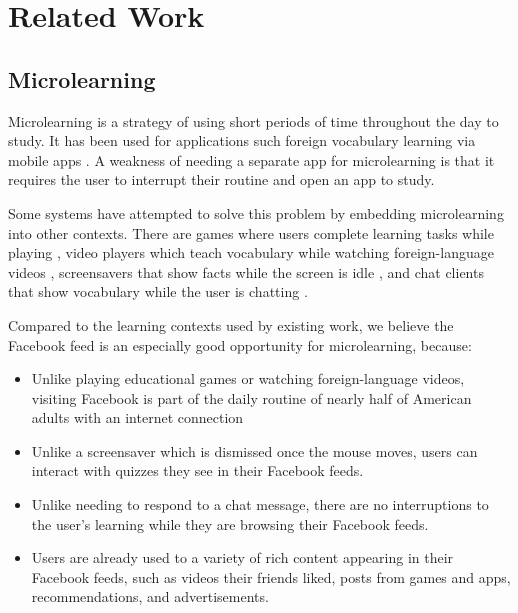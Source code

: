 \documentclass{chi-ext}
\begin{document}
\section{Related Work}

\subsection{Microlearning}

Microlearning is a strategy of using short periods of time throughout the day to study. It has been used for applications such foreign vocabulary learning via mobile apps \cite{microlearning} \cite{micromandarin}. A weakness of needing a separate app for microlearning is that it requires the user to interrupt their routine and open an app to study. %

Some systems have attempted to solve this problem by embedding microlearning into other contexts. There are games where users complete learning tasks while playing \cite{carriearcade}, video players which teach vocabulary while watching foreign-language videos \cite{smartsubtitles}, screensavers that show facts while the screen is idle \cite{screensaver}, and chat clients that show vocabulary while the user is chatting \cite{waitlearning}.

Compared to the learning contexts used by existing work, we believe the Facebook feed is an especially good opportunity for microlearning, because:

\begin{itemize}
\item Unlike playing educational games or watching foreign-language videos, visiting Facebook is part of the daily routine of nearly half of American adults with an internet connection \cite{socialmediaupdate} %
\item Unlike a screensaver which is dismissed once the mouse moves, users can interact with quizzes they see in their Facebook feeds.
\item Unlike needing to respond to a chat message, there are no interruptions to the user's learning while they are browsing their Facebook feeds.
\item Users are already used to a variety of rich content appearing in their Facebook feeds, such as videos their friends liked, posts from games and apps, recommendations, and advertisements.
\end{itemize}
\end{document}

